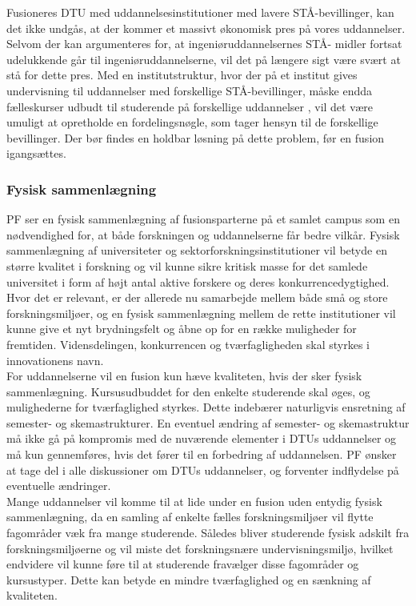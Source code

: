 Fusioneres DTU med uddannelsesinstitutioner med lavere STÅ-bevillinger, kan det ikke undgås, at der kommer et massivt økonomisk pres på vores uddannelser. Selvom der kan argumenteres for, at ingeniøruddannelsernes STÅ- midler fortsat udelukkende går til ingeniøruddannelserne, vil det på længere sigt være svært at stå for dette pres. Med en institutstruktur, hvor der på et institut gives undervisning til uddannelser med forskellige STÅ-bevillinger, måske endda fælleskurser udbudt til studerende på forskellige uddannelser , vil det være umuligt at opretholde en fordelingsnøgle, som tager hensyn til de forskellige bevillinger. Der bør findes en holdbar løsning på dette problem, før en fusion igangsættes.

\subsubsection{Fysisk sammenlægning}
PF ser en fysisk sammenlægning af fusionsparterne på et samlet campus som en nødvendighed for, at både forskningen og uddannelserne får bedre vilkår. Fysisk sammenlægning af universiteter og sektorforskningsinstitutioner vil betyde en større kvalitet i forskning og vil kunne sikre kritisk masse for det samlede universitet i form af højt antal aktive forskere og deres konkurrencedygtighed. Hvor det er relevant, er der allerede nu samarbejde mellem både små og store forskningsmiljøer, og en fysisk sammenlægning mellem de rette institutioner vil kunne give et nyt brydningsfelt og åbne op for en række muligheder for fremtiden. Vidensdelingen, konkurrencen og tværfagligheden skal styrkes i innovationens navn.\\

For uddannelserne vil en fusion kun hæve kvaliteten, hvis der sker fysisk sammenlægning. Kursusudbuddet for den enkelte studerende skal øges, og mulighederne for tværfaglighed styrkes. Dette indebærer naturligvis ensretning af semester- og skemastrukturer. En eventuel ændring af semester- og skemastruktur må ikke gå på kompromis med de nuværende elementer i DTUs uddannelser og må kun gennemføres, hvis det fører til en forbedring af uddannelsen. PF ønsker at tage del i alle diskussioner om DTUs uddannelser, og forventer indflydelse på eventuelle ændringer.\\

Mange uddannelser vil komme til at lide under en fusion uden entydig fysisk sammenlægning, da en samling af enkelte fælles forskningsmiljøer vil flytte fagområder væk fra mange studerende. Således bliver studerende fysisk adskilt fra forskningsmiljøerne og vil miste det forskningsnære undervisningsmiljø, hvilket endvidere vil kunne føre til at studerende fravælger disse fagområder og kursustyper. Dette kan betyde en mindre tværfaglighed og en sænkning af kvaliteten.\\


